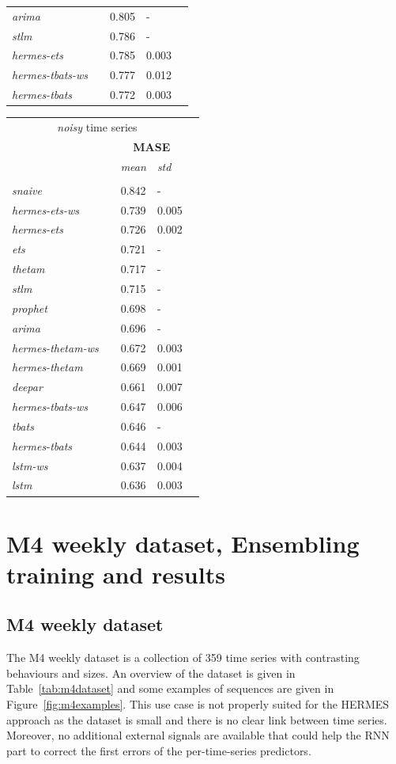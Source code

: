 \documentclass[10pt]{article} %
\begin{document}
\begin{table}
{\begin{tabular}{l||llll}
	 \textit{arima} && 0.805 & -\\ 
	 \textit{stlm} && 0.786 & -\\ 
	 \textit{hermes-ets} && 0.785 & 0.003\\ 
	 \textit{hermes-tbats-ws} && 0.777 & 0.012\\ 
	 \textit{hermes-tbats} && 0.772 & 0.003\\ 
  \end{tabular}\hspace{1cm}
  \begin{tabular}{l||llll}
   \multicolumn{4}{c}{\textit{noisy} time series}\\
   &&\multicolumn{2}{c}{\textbf{MASE}} \\
    &&  \textit{mean}  & \textit{std}  \\
	\hline
	 &&& \\
     \textit{snaive} && 0.842 & -\\ 
	 \textit{hermes-ets-ws} && 0.739 & 0.005\\ 
	 \textit{hermes-ets} && 0.726 & 0.002\\ 
	 \textit{ets} && 0.721 & -\\ 
	 \textit{thetam} && 0.717 & -\\ 
	 \textit{stlm} && 0.715 & -\\ 
	 \textit{prophet} && 0.698 & -\\ 
	 \textit{arima} && 0.696 & -\\ 
	 \textit{hermes-thetam-ws} && 0.672 & 0.003\\ 
	 \textit{hermes-thetam} && 0.669 & 0.001\\ 
	 \textit{deepar} && 0.661 & 0.007\\ 
	 \textit{hermes-tbats-ws} && 0.647 & 0.006\\ 
	 \textit{tbats} && 0.646 & -\\ 
	 \textit{hermes-tbats} && 0.644 & 0.003\\ 
	 \textit{lstm-ws} && 0.637 & 0.004\\ 
	 \textit{lstm} && 0.636 & 0.003\\
  \end{tabular}
 }
 \label{tab:fashionsubsample}
\end{table}

\section{M4 weekly dataset, Ensembling training and results}

\subsection{M4 weekly dataset}
\label{sec:m4overview}
The M4 weekly dataset is a collection of 359 time series with  contrasting behaviours and sizes. An overview of the dataset is given in Table~\ref{tab:m4dataset} and some examples of sequences are given in Figure~\ref{fig:m4examples}. This use case is not properly suited for the HERMES approach as the dataset is small and there is no clear link between time series. Moreover, no additional external signals are available that could help the RNN part to correct the first errors of the per-time-series predictors.
\end{document}
